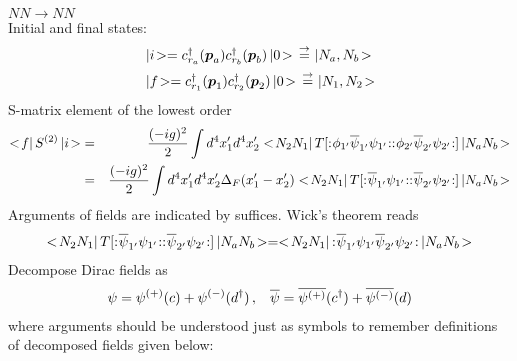 \noindent
\underline{$NN \to NN$}\\
Initial and final states:
\begin{eqnarray}
\begin{array}{l}
\ketend i \ket
= c_{r_a}^\dagger (\bld{p}_a) c_{r_b}^\dagger (\bld{p}_b) \ketend 0 \ket
\rightdef \ketend N_a, N_b \ket
\vspace{2mm}
\\
\ketend f \ket
= c_{r_1}^\dagger (\bld{p}_1) c_{r_2}^\dagger (\bld{p}_2) \ketend 0 \ket
\rightdef \ketend N_1, N_2 \ket
\end{array}
\label{eqn:IniFinNNtoNN}
\end{eqnarray}
S-matrix element of the lowest order
\begin{eqnarray}
<\! f |\, S^{(2)} \,| i \!>
&=&
\frac{(-ig)^2}{2} \int d^4 x_1' d^4 x_2'
<\! N_2 N_1 |\,
T[{:\mathrel{\mspace{1mu}\phi_{1'} \overline{\psi}_{1'} \psi_{1'}\mspace{1mu}}:}
{:\mathrel{\mspace{1mu}\phi_{2'} \overline{\psi}_{2'} \psi_{2'}\mspace{1mu}}:}
]
\,| N_a N_b \!>
\nonumber\\
&=&
\frac{(-ig)^2}{2} \int d^4 x_1' d^4 x_2'
\Delta_F(x_1' - x_2')
<\! N_2 N_1 |\,
T[{:\mathrel{\mspace{1mu}\overline{\psi}_{1'} \psi_{1'}\mspace{1mu}}:}
{:\mathrel{\mspace{1mu} \overline{\psi}_{2'} \psi_{2'}\mspace{1mu}}:}
]
\,| N_a N_b \!>
\nonumber\\
\label{eqn:DiracNNNNS2formula}
\end{eqnarray}
Arguments of fields are indicated by suffices.
Wick's theorem reads
\begin{eqnarray}
<\! N_2 N_1 |\,
T[{:\mathrel{\mspace{1mu}\overline{\psi}_{1'} \psi_{1'}\mspace{1mu}}:}
{:\mathrel{\mspace{1mu} \overline{\psi}_{2'} \psi_{2'}\mspace{1mu}}:}
]
\,| N_a N_b \!>
=
<\! N_2 N_1 |\,
{:\mathrel{\mspace{1mu}\overline{\psi}_{1'} \psi_{1'}
 \overline{\psi}_{2'} \psi_{2'}
\mspace{1mu}}:}
\,| N_a N_b \!>
\label{eqn:DiracNNNNsand}
\end{eqnarray}
Decompose Dirac fields as
\begin{eqnarray}
\psi = \psi^{(+)}(c) + \psi^{(-)}(d^\dagger)\,,
\hspace{3mm}
\overline{\psi} = \overline{\psi^{(+)}}(c^\dagger) + \overline{\psi^{(-)}}(d)
\label{eqn:DiracSpDecomp}
\end{eqnarray}
where arguments should be understood just as symbols to remember definitions
of decomposed fields given below:
